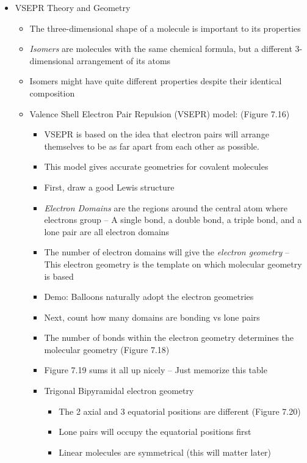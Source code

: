 \documentclass[12pt, openany, letterpaper]{memoir}
\begin{document}
\begin{itemize}
  \item VSEPR Theory and Geometry
    \begin{itemize}
      \item The three-dimensional shape of a molecule is important to its properties
      \item \emph{Isomers} are molecules with the same chemical formula, but a different 3-dimensional arrangement of its atoms
      \item Isomers might have quite different properties despite their identical composition
      \item Valence Shell Electron Pair Repulsion (VSEPR) model: (Figure 7.16)
            \begin{itemize}
              \item VSEPR is based on the idea that electron pairs will arrange themselves to be as far apart from each other as possible.
              \item This model gives accurate geometries for covalent molecules
              \item First, draw a good Lewis structure
              \item \emph{Electron Domains} are the regions around the central atom where electrons group -- A single bond, a double bond, a triple bond, and a lone pair are all electron domains
              \item The number of electron domains will give the \emph{electron geometry} -- This electron geometry is the template on which molecular geometry is based
              \item Demo: Balloons naturally adopt the electron geometries
              \item Next, count how many domains are bonding vs lone pairs
              \item The number of bonds within the electron geometry determines the molecular geometry (Figure 7.18)
              \item Figure 7.19 sums it all up nicely -- Just memorize this table
              \item Trigonal Bipyramidal electron geometry
                    \begin{itemize}
                      \item The 2 axial and 3 equatorial positions are different (Figure 7.20)
                      \item Lone pairs will occupy the equatorial positions first
                      \item Linear molecules are symmetrical (this will matter later)

\end{itemize}
\end{itemize}
\end{itemize}
\end{itemize}
\end{document}
